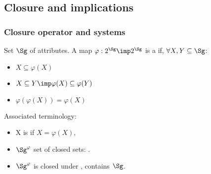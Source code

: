 

\subsection{Closure and implications}

\begin{frame}
\frametitle{Closure operator and systems}

Set $\Sg$ of attributes. A map $\varphi: 2^{\Sg} \imp 2^{\Sg}$ is a 
 if, $\forall X, Y \subseteq \Sg$:
\begin{itemize}
	\item $X \subseteq \varphi(X)$ \quad {}
	\item $X \subseteq Y \imp \varphi(X) \subseteq \varphi(Y)$ 
	\quad {}
	\item $\varphi(\varphi(X)) = \varphi(X)$ \quad {}
\end{itemize}

\vspace{1.2em}

Associated terminology:
\begin{itemize}
	\item X is  if $X = \varphi(X)$,
	\item $\Sg^\varphi$ set of closed sets: .
	\item $\Sg^\varphi$ is closed under , contains $\Sg$.
\end{itemize}

\end{frame}


